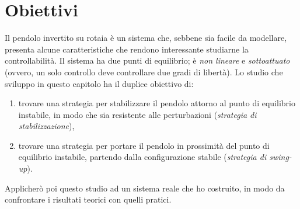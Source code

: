 \section{Obiettivi}
Il pendolo invertito su rotaia è un sistema che,
sebbene sia facile da modellare, presenta alcune
caratteristiche che rendono interessante studiarne la
controllabilità.
Il sistema ha due punti di equilibrio; è
\emph{non lineare} e \emph{sottoattuato} (ovvero, un solo controllo
deve controllare due gradi di libertà).
Lo studio che sviluppo in questo capitolo ha il duplice obiettivo di:
\begin{enumerate}
    \item trovare una strategia per stabilizzare il pendolo attorno al punto di equilibrio instabile, in modo che sia resistente alle perturbazioni (\emph{strategia di stabilizzazione}),
    \item trovare una strategia per portare il pendolo in prossimità del punto di equilibrio instabile, partendo dalla configurazione stabile (\emph{strategia di swing-up}).
\end{enumerate}
Applicherò poi questo studio ad un sistema reale che ho costruito, 
in modo da confrontare i risultati teorici con quelli pratici.